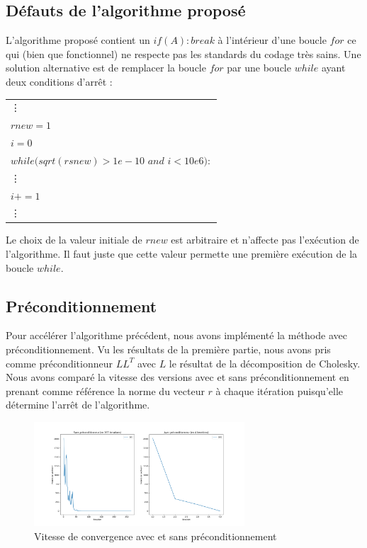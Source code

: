 \documentclass{article}
\begin{document}
\subsection{D\'efauts de l'algorithme propos\'e}
L'algorithme propos\'e contient un $if(A):break$ \`a l'int\'erieur d'une boucle $for$ ce qui (bien que fonctionnel) ne respecte pas les standards du codage tr\`es sains. Une solution alternative est de remplacer la boucle $for$ par une boucle $while$ ayant deux conditions d'arr\^et :
\begin{center}
    \begin{tabular}{|l|}
        \hline 
        \vdots\\
        $rnew = 1$\\
        $i=0$\\
        $while(sqrt(rsnew) > 1e-10$ $and$ $i < 10e6):$\\
        \hspace{5mm} \vdots\\
        \hspace{5mm} $i+=1$\\
        \vdots\\
        \hline
    \end{tabular}
\end{center}
Le choix de la valeur initiale de $rnew$ est arbitraire et n'affecte pas l'ex\'ecution de l'algorithme. Il faut juste que cette valeur permette une premi\`ere ex\'ecution de la boucle $while$.

\subsection{Pr\'econditionnement}
Pour acc\'el\'erer l'algorithme pr\'ec\'edent, nous avons impl\'ement\'e la m\'ethode avec pr\'econditionnement. Vu les r\'esultats de la premi\`ere partie, nous avons pris comme pr\'econditionneur $LL^T$ avec $L$ le r\'esultat de la d\'ecomposition de Cholesky.
Nous avons compar\'e la vitesse des versions avec et sans pr\'econditionnement en prenant comme r\'ef\'erence la norme du vecteur $r$ \`a chaque it\'eration puisqu’elle d\'etermine l'arr\^et de l'algorithme.

\begin{figure}[!ht]
    \centering
    \includegraphics[width=0.7\textwidth]{precond.png}
    \caption{Vitesse de convergence avec et sans pr\'econditionnement}
    \label{fig:1}
\end{figure}
\end{document}
